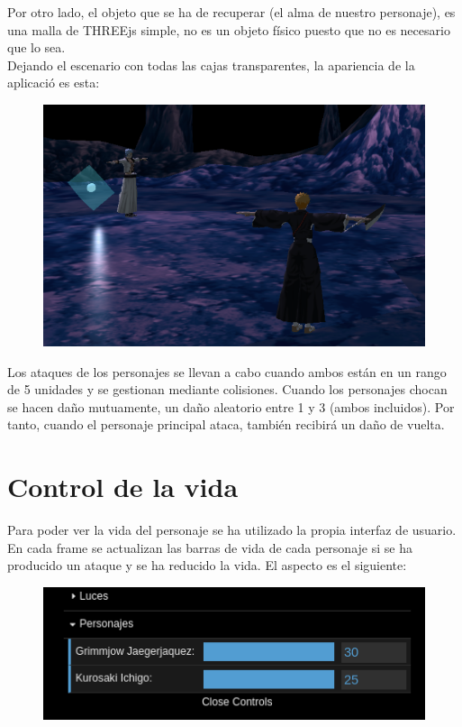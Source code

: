 \documentclass[11pt,a4paper]{article}
\begin{document}
Por otro lado, el objeto que se ha de recuperar (el alma de nuestro personaje), es una malla de THREEjs simple, no es un objeto físico puesto que no es necesario que lo sea.\\

Dejando el escenario con todas las cajas transparentes, la apariencia de la aplicació es esta:

\begin{figure}[H]
	\centering
	\includegraphics[scale=0.37]{img/inicio.png}
\end{figure}

Los ataques de los personajes se llevan a cabo cuando ambos están en un rango de 5 unidades y se gestionan mediante colisiones. Cuando los personajes chocan se hacen daño mutuamente, un daño aleatorio entre 1 y 3 (ambos incluidos). Por tanto, cuando el personaje principal ataca, también recibirá un daño de vuelta.

\section{Control de la vida}

Para poder ver la vida del personaje se ha utilizado la propia interfaz de usuario. En cada frame se actualizan las barras de vida de cada personaje si se ha producido un ataque y se ha reducido la vida. El aspecto es el siguiente:

\begin{figure}[H]
	\centering
	\includegraphics[scale=0.5]{img/barravida.png}
\end{figure}
\end{document}
